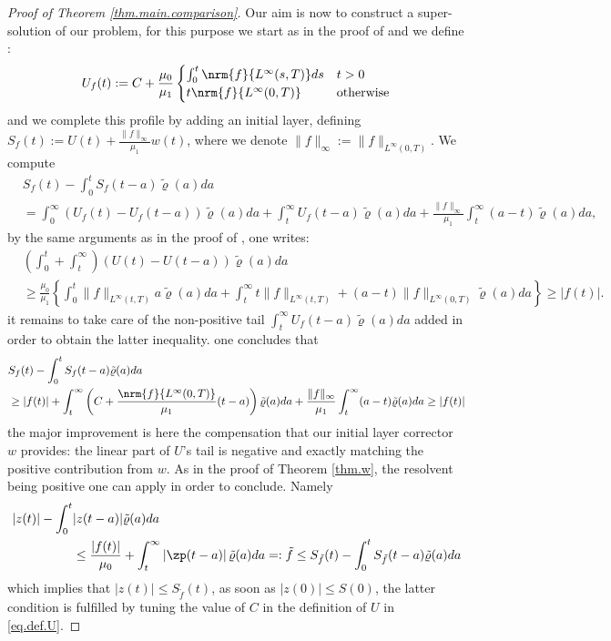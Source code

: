 \documentclass[]{jnsao}
\newcommand{\tkernel}{\tilde{\varrho}}
\begin{document}
 \begin{proof}[Proof of Theorem \ref{thm.main.comparison}]
 	Our aim is now to construct a super-solution of our problem, for this purpose we start as in the proof of \cite[Theorem 1.1]{MiOel.1} and we define :
 	\begin{equation}\label{eq.def.U}
 	U_f(t) :=  C  + \frac{\mu_0}{\mu_1} \begin{cases}
 		\int_0^t \nrm{f}{L^\infty(s,T)} ds & t > 0 \\
 		t \nrm{f}{L^\infty(0,T)}& \text{otherwise}
 	\end{cases}
 	\end{equation}
 	and we complete this profile by adding an initial layer, 
	defining $S_f(t) := U(t) +\frac{ \|f\|_\infty }{\mu_1} w(t)$, where we denote 
	$\|f\|_\infty := \|f\|_{L^\infty(0,T)}$. 
	We compute 
 	\begin{align}
 		&S_f(t) - \int_0^t S_f(t-a) \tkernel(a) da \\
 		&= \int_0^\infty \left(U_f(t) - U_f(t-a)\right) \tkernel (a) da  
		+ \int_t^\infty U_f(t-a) \tkernel(a) da 
		+\frac{ \|f\|_\infty  }{\mu_1}  \int_t^\infty (a-t) \tkernel(a) da,  
 	\end{align}
 	by the same arguments as in the proof of \cite[Theorem 1.1]{MiOel.1}, one writes:
	$$
	\begin{aligned}
	& \left(\int_0^t + \int_t^\infty \right)\left( U(t)-U(t-a)\right) \tkernel(a)da \\
	& \geq 
	\frac{\mu_0}{\mu_1} \left\{\int_0^t \|f\|_{L^\infty(t,T)} a \tkernel(a) da 
	+ \int_t^\infty t \|f\|_{L^\infty(t,T)}  + (a-t) \|f\|_{L^\infty(0,T)} \tkernel(a) da \right\}\geq |f(t)|. 
	\end{aligned}
	$$
	it remains to take care of the non-positive tail $\int_t^\infty U_f(t-a) \tkernel(a) da$ added in order to obtain the latter inequality.	
	one concludes that
 	\begin{align}
 	&S_f (t) - \int_0^t S_f(t-a) \tkernel(a) da \\
	&\geq | f(t) | + \int_t^\infty \left(C+ \frac{\nrm{f}{L^\infty(0,T)} }{\mu_1} (t-a) \right)\tkernel(a) da  +  \frac{ \|f\|_\infty  }{\mu_1}  \int_t^\infty (a-t) \tkernel(a) da  \geq | f(t) | 
 	\end{align}
 	the major improvement is here the compensation that our initial layer corrector $w$ provides: the linear part of $U$'s tail is negative and exactly 
 	matching the positive contribution from $w$. 
	As in the proof of Theorem \ref{thm.w},  the resolvent being positive one can apply \cite[Lemma 9.8.2 p. 257]{grip} in order to conclude. 
	Namely 
	$$
 	\begin{aligned}
 	|z(t)| - \int_0^t & |z(t-a)| \tkernel(a) da \\
	&  \leq \frac{|f(t)| }{\mu_0}
	+ \int_t^\infty \left|  \zp(t-a) \right|\tkernel(a) da =: \tilde{f} \leq S_{\tilde f} (t)- \int_0^t S_{\tilde f}(t-a) \tkernel(a) da 
 	\end{aligned}
 	$$
 	which implies that $|z(t)| \leq S_{\tilde{f}}(t)$, as soon as $|z(0)| \leq S(0)$, the latter condition is fulfilled by tuning the value of $C$ in the definition of $U$ in \eqref{eq.def.U}.
 \end{proof}
 
\end{document}
